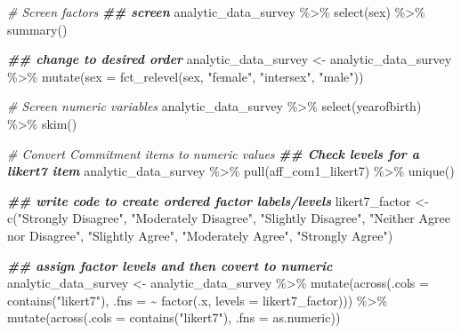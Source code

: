 \documentclass[
]{krantz}
\makeatletter
\newenvironment{Shaded}{\begin{snugshade}}{\end{snugshade}}
\newcommand{\AttributeTok}[1]{\textcolor[rgb]{0.61,0.61,0.61}{#1}}
\newcommand{\CommentTok}[1]{\textcolor[rgb]{0.37,0.37,0.37}{\textit{#1}}}
\newcommand{\DocumentationTok}[1]{\textcolor[rgb]{0.37,0.37,0.37}{\textbf{\textit{#1}}}}
\newcommand{\FunctionTok}[1]{\textcolor[rgb]{0,0,0}{#1}}
\newcommand{\NormalTok}[1]{#1}
\newcommand{\OtherTok}[1]{\textcolor[rgb]{0.37,0.37,0.37}{#1}}
\newcommand{\SpecialCharTok}[1]{\textcolor[rgb]{0,0,0}{#1}}
\newcommand{\StringTok}[1]{\textcolor[rgb]{0.5,0.5,0.5}{#1}}
\newenvironment{kframe}{%
\medskip{}
\setlength{\fboxsep}{.8em}
 \def\at@end@of@kframe{}%
 \ifinner\ifhmode%
  \def\at@end@of@kframe{\end{minipage}}%
  \begin{minipage}{\columnwidth}%
 \fi\fi%
 \def\FrameCommand##1{\hskip\@totalleftmargin \hskip-\fboxsep
 \colorbox{shadecolor}{##1}\hskip-\fboxsep
     \hskip-\linewidth \hskip-\@totalleftmargin \hskip\columnwidth}%
 \MakeFramed {\advance\hsize-\width
   \@totalleftmargin\z@ \linewidth\hsize
   \@setminipage}}%
 {\par\unskip\endMakeFramed%
 \at@end@of@kframe}
\renewenvironment{Shaded}{\begin{kframe}}{\end{kframe}}
\makeatother
\begin{document}
\begin{Shaded}
\begin{Highlighting}[]
\CommentTok{\# Screen factors}
\DocumentationTok{\#\# screen}
\NormalTok{analytic\_data\_survey }\SpecialCharTok{\%\textgreater{}\%}
  \FunctionTok{select}\NormalTok{(sex) }\SpecialCharTok{\%\textgreater{}\%}
  \FunctionTok{summary}\NormalTok{()}

\DocumentationTok{\#\# change to desired order}
\NormalTok{analytic\_data\_survey }\OtherTok{\textless{}{-}}\NormalTok{ analytic\_data\_survey }\SpecialCharTok{\%\textgreater{}\%}
  \FunctionTok{mutate}\NormalTok{(}\AttributeTok{sex =} \FunctionTok{fct\_relevel}\NormalTok{(sex,}
                           \StringTok{"female"}\NormalTok{,}
                           \StringTok{"intersex"}\NormalTok{,}
                           \StringTok{"male"}\NormalTok{))}


\CommentTok{\# Screen numeric variables}
\NormalTok{analytic\_data\_survey }\SpecialCharTok{\%\textgreater{}\%}
  \FunctionTok{select}\NormalTok{(yearofbirth) }\SpecialCharTok{\%\textgreater{}\%}
  \FunctionTok{skim}\NormalTok{()}




\CommentTok{\# Convert Commitment items to numeric  values}
\DocumentationTok{\#\# Check levels for a likert7 item}
\NormalTok{analytic\_data\_survey }\SpecialCharTok{\%\textgreater{}\%}
  \FunctionTok{pull}\NormalTok{(aff\_com1\_likert7) }\SpecialCharTok{\%\textgreater{}\%}
  \FunctionTok{unique}\NormalTok{()}

\DocumentationTok{\#\# write code to create ordered factor labels/levels}
\NormalTok{likert7\_factor }\OtherTok{\textless{}{-}} \FunctionTok{c}\NormalTok{(}\StringTok{"Strongly Disagree"}\NormalTok{,}
                    \StringTok{"Moderately Disagree"}\NormalTok{,}
                    \StringTok{"Slightly Disagree"}\NormalTok{,}
                    \StringTok{"Neither Agree nor Disagree"}\NormalTok{,}
                    \StringTok{"Slightly Agree"}\NormalTok{,}
                    \StringTok{"Moderately Agree"}\NormalTok{,}
                    \StringTok{"Strongly Agree"}\NormalTok{)}


\DocumentationTok{\#\# assign factor levels and then covert to numeric}
\NormalTok{analytic\_data\_survey }\OtherTok{\textless{}{-}}\NormalTok{ analytic\_data\_survey }\SpecialCharTok{\%\textgreater{}\%}
  \FunctionTok{mutate}\NormalTok{(}\FunctionTok{across}\NormalTok{(}\AttributeTok{.cols =} \FunctionTok{contains}\NormalTok{(}\StringTok{"likert7"}\NormalTok{), }
                \AttributeTok{.fns =} \SpecialCharTok{\textasciitilde{}} \FunctionTok{factor}\NormalTok{(.x, }\AttributeTok{levels =}\NormalTok{ likert7\_factor))) }\SpecialCharTok{\%\textgreater{}\%}
  \FunctionTok{mutate}\NormalTok{(}\FunctionTok{across}\NormalTok{(}\AttributeTok{.cols =} \FunctionTok{contains}\NormalTok{(}\StringTok{"likert7"}\NormalTok{), }
                \AttributeTok{.fns =}\NormalTok{ as.numeric))}



\end{Highlighting}
\end{Shaded}
\end{document}
